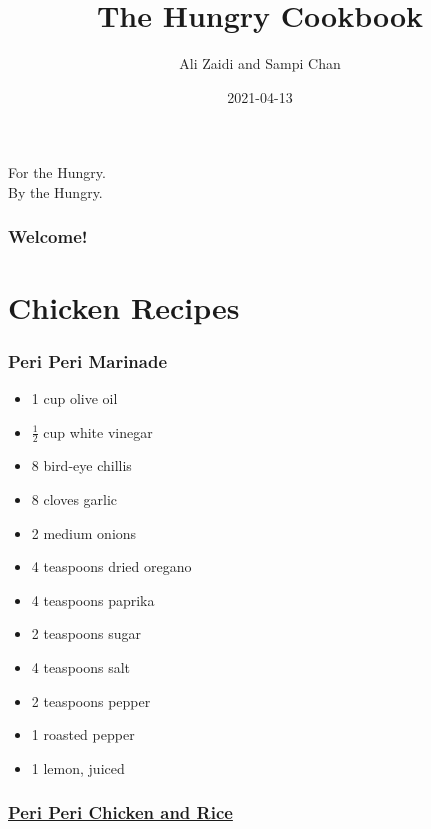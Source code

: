 \documentclass[]{article}
\title{The Hungry Cookbook}
\author{Ali Zaidi and Sampi Chan}
\date{2021-04-13}
\providecommand{\tightlist}{%
  \setlength{\itemsep}{0pt}\setlength{\parskip}{0pt}}
\begin{document}
\maketitle


\begin{center}
For the Hungry. \\
By the Hungry.

\end{center}

{
\setcounter{tocdepth}{2}
\tableofcontents
}
\hypertarget{welcome}{%
\section*{Welcome!}\label{welcome}}

\hypertarget{part-chicken-recipes}{%
\part{Chicken Recipes}\label{part-chicken-recipes}}

\hypertarget{peri-peri-marinade}{%
\section{Peri Peri Marinade}\label{peri-peri-marinade}}

\begin{itemize}
\tightlist
\item
  1 cup olive oil
\item
  \(\frac{1}{2}\) cup white vinegar
\item
  8 bird-eye chillis
\item
  8 cloves garlic
\item
  2 medium onions
\item
  4 teaspoons dried oregano
\item
  4 teaspoons paprika
\item
  2 teaspoons sugar
\item
  4 teaspoons salt
\item
  2 teaspoons pepper
\item
  1 roasted pepper
\item
  1 lemon, juiced
\end{itemize}

\hypertarget{peri-peri-chicken-and-rice}{%
\section{\texorpdfstring{\href{https://www.moribyan.com/recipe-view/peri-peri-style-chicken-and-rice/}{Peri Peri Chicken and Rice}}{Peri Peri Chicken and Rice}}\label{peri-peri-chicken-and-rice}}
\end{document}
